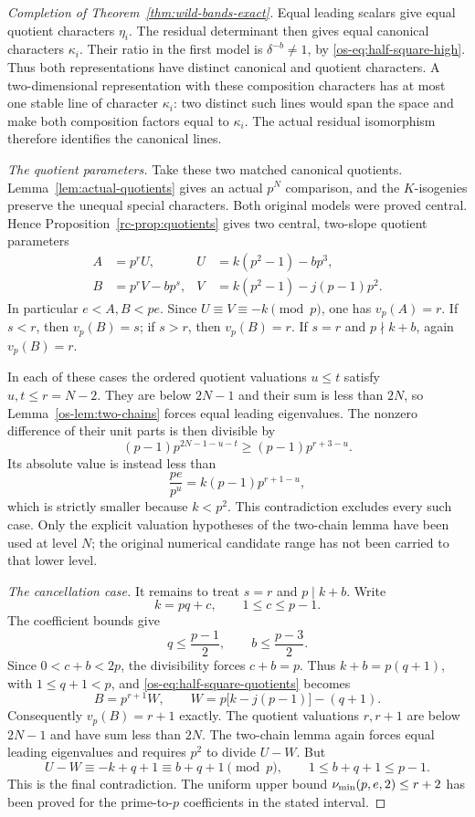 \begin{proof}[Completion of Theorem~\ref{thm:wild-bands-exact}]
Equal leading scalars give equal quotient characters $\eta_i$.
The residual determinant then gives equal canonical characters
$\kappa_i$.  Their ratio in the first model is $\delta^{-b}\ne1$,
by \eqref{os-eq:half-square-high}.  Thus both representations have
distinct canonical and quotient characters.  A two-dimensional
representation with these composition characters has at most one
stable line of character $\kappa_i$: two distinct such lines would
span the space and make both composition factors equal to
$\kappa_i$.  The actual residual isomorphism therefore identifies
the canonical lines.

\smallskip\noindent
\emph{The quotient parameters.}
Take these two matched canonical quotients.
Lemma~\ref{lem:actual-quotients} gives an actual $p^N$ comparison,
and the $K$-isogenies preserve the unequal special characters.
Both original models were proved central.  Hence
Proposition~\ref{rc-prop:quotients} gives two central, two-slope
quotient parameters
\begin{equation}\label{os-eq:half-square-quotients}
 \begin{aligned}
 A&=p^rU, & U&=k(p^2-1)-bp^3,\\
 B&=p^rV-bp^s, & V&=k(p^2-1)-j(p-1)p^2.
 \end{aligned}
\end{equation}
In particular $e<A,B<pe$.  Since $U\equiv V\equiv-k\pmod p$,
one has $v_p(A)=r$.  If $s<r$, then $v_p(B)=s$; if $s>r$, then
$v_p(B)=r$.  If $s=r$ and $p\nmid k+b$, again $v_p(B)=r$.

In each of these cases the ordered quotient valuations $u\le t$
satisfy $u,t\le r=N-2$.  They are below $2N-1$ and their sum is
less than $2N$, so Lemma~\ref{os-lem:two-chains} forces equal
leading eigenvalues.  The nonzero difference of their unit parts
is then divisible by
\[
 (p-1)p^{2N-1-u-t}\ge(p-1)p^{r+3-u}.
\]
Its absolute value is instead less than
\[
 \frac{pe}{p^u}=k(p-1)p^{r+1-u},
\]
which is strictly smaller because $k<p^2$.  This contradiction
excludes every such case.  Only the explicit valuation hypotheses
of the two-chain lemma have been used at level $N$; the original
numerical candidate range has not been carried to that lower level.

\smallskip\noindent
\emph{The cancellation case.}
It remains to treat $s=r$ and $p\mid k+b$.  Write
\[
 k=pq+c,\qquad 1\le c\le p-1.
\]
The coefficient bounds give
\[
 q\le\frac{p-1}{2},\qquad b\le\frac{p-3}{2}.
\]
Since $0<c+b<2p$, the divisibility forces $c+b=p$.  Thus
$k+b=p(q+1)$, with $1\le q+1<p$, and
\eqref{os-eq:half-square-quotients} becomes
\[
 B=p^{r+1}W,
 \qquad W=p\bigl[k-j(p-1)\bigr]-(q+1).
\]
Consequently $v_p(B)=r+1$ exactly.  The quotient valuations $r,r+1$
are below $2N-1$ and have sum less than $2N$.  The two-chain lemma
again forces equal leading eigenvalues and requires $p^2$ to divide
$U-W$.  But
\[
 U-W\equiv-k+q+1\equiv b+q+1\pmod p,
 \qquad 1\le b+q+1\le p-1.
\]
This is the final contradiction.  The uniform upper bound
$\nu_{\min}(p,e,2)\le r+2$ has been proved for the prime-to-$p$
coefficients in the stated interval.


\end{proof}
